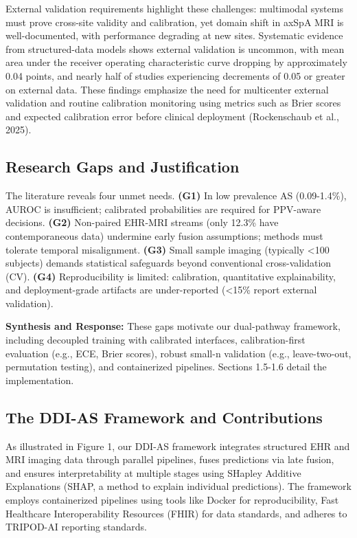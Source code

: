 \documentclass[12pt, a4paper]{article}
\begin{document}
External validation requirements highlight these challenges: multimodal systems must prove cross-site validity and calibration, yet domain shift in axSpA MRI is well-documented, with performance degrading at new sites. Systematic evidence from structured-data models shows external validation is uncommon, with mean area under the receiver operating characteristic curve dropping by approximately 0.04 points, and nearly half of studies experiencing decrements of 0.05 or greater on external data. These findings emphasize the need for multicenter external validation and routine calibration monitoring using metrics such as Brier scores and expected calibration error before clinical deployment (Rockenschaub et al., 2025).
\subsection{Research Gaps and Justification}
The literature reveals four unmet needs. \textbf{(G1)} In low prevalence AS (0.09-1.4\%), AUROC is insufficient; calibrated probabilities are required for PPV-aware decisions. \textbf{(G2)} Non-paired EHR-MRI streams (only 12.3\% have contemporaneous data) undermine early fusion assumptions; methods must tolerate temporal misalignment. \textbf{(G3)} Small sample imaging (typically <100 subjects) demands statistical safeguards beyond conventional cross-validation (CV). \textbf{(G4)} Reproducibility is limited: calibration, quantitative explainability, and deployment-grade artifacts are under-reported (<15\% report external validation).

\textbf{Synthesis and Response:} These gaps motivate our dual-pathway framework, including decoupled training with calibrated interfaces, calibration-first evaluation (e.g., ECE, Brier scores), robust small-n validation (e.g., leave-two-out, permutation testing), and containerized pipelines. Sections 1.5-1.6 detail the implementation.

\subsection{The DDI-AS Framework and Contributions}
As illustrated in Figure 1, our DDI-AS framework integrates structured EHR and MRI imaging data through parallel pipelines, fuses predictions via late fusion, and ensures interpretability at multiple stages using SHapley Additive Explanations (SHAP, a method to explain individual predictions). The framework employs containerized pipelines using tools like Docker for reproducibility, Fast Healthcare Interoperability Resources (FHIR) for data standards, and adheres to TRIPOD-AI reporting standards.
\end{document}
